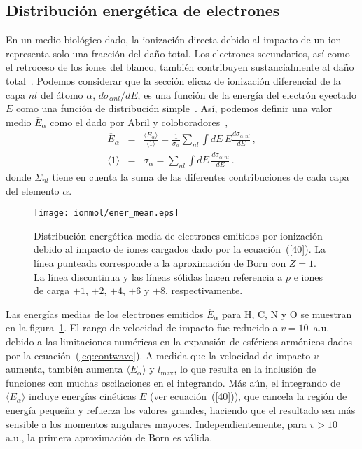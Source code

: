 \subsection{Distribución energética de electrones}
\label{subsec:meanener}

En un medio biológico dado, la ionización directa debido al impacto de
un ion representa solo una fracción del daño total. Los electrones
secundarios, así como el retroceso de los iones del blanco, también
contribuyen sustancialmente al daño total~\cite{Denifl2011}. 
Podemos considerar que la sección eficaz de ionización diferencial de la
capa $nl$ del átomo $\alpha$, $d\sigma_{\alpha nl}/dE$, es una función 
de la energía del electrón eyectado $E$ como una función de distribución
simple~\cite{surdutovic2018}. Así, podemos definir una valor medio 
$\overline{E}_{\alpha}$ como el dado por Abril y 
coloboradores~\cite{abril2015},
\begin{eqnarray}
\overline{E}_{\alpha} &=&\frac{\langle E_{\alpha}\rangle}{\langle
1\rangle}=\frac{1}{\sigma_{\alpha}}\sum\limits_{nl}\int dE\,E
\frac{d\sigma_{\alpha,nl}}{dE}\,,  
\label{40} \\
\langle 1\rangle &=&\sigma_{\alpha}=\sum\limits_{nl}\int dE\,
\frac{d\sigma_{\alpha,nl}}{dE}\,. 
\label{50}
\end{eqnarray}
donde $\Sigma_{nl}$ tiene en cuenta la suma de las diferentes 
contribuciones de cada capa del elemento $\alpha$.

\begin{figure}
\centering
\texttt{[image: ionmol/ener\_mean.eps]}
\caption[Distribución energética media de electrones emitidos.]
{Distribución energética media de electrones emitidos por ionización 
debido al impacto de iones cargados dado por la ecuación~(\ref{40}). 
La línea punteada corresponde a la aproximación de Born con $Z=1$.
La línea discontinua y las líneas sólidas hacen referencia a $\bar{p}$ e 
iones de carga $+1$, $+2$, $+4$, $+6$ y $+8$, respectivamente.}
\label{fig:emittedener}
\end{figure} 

Las energías medias de los electrones emitidos $\overline{E}_{\alpha}$ 
para H, C, N y O se muestran en la figura~\ref{fig:emittedener}. 
El rango de velocidad de impacto fue reducido a $v=10$~a.u. debido 
a las limitaciones numéricas en la expansión de esféricos armónicos dados
por la ecuación~(\ref{eq:contwave}). A medida que la velocidad de 
impacto $v$ aumenta, también aumenta $\langle E_{\alpha}\rangle$ y
$l_{\max}$, lo que resulta en la inclusión de funciones con muchas 
oscilaciones en el integrando. Más aún, el integrando de 
$\langle E_{\alpha}\rangle$ incluye energías cinéticas $E$
(ver ecuación~(\ref{40})), que cancela la región de energía pequeña y 
refuerza los valores grandes, haciendo que el resultado sea más 
sensible a los momentos angulares mayores. Independientemente, para 
$v>10$ a.u., la primera aproximación de Born es válida. 

